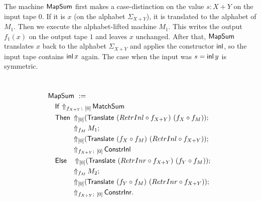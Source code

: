 The machine $\MS{MapSum}$ first makes a case-distinction on the value $s:X+Y$ on the input tape $0$.  If it is $x$ (on the alphabet $\Sigma_{X+Y}$),
it is translated to the alphabet of $M_1$.  Then we execute the alphabet-lifted machine $M_1$.  This writes the output $f_1(x)$ on the output tape $1$
and leaves $x$ unchanged.  After that, $\MS{MapSum}$ translates $x$ back to the alphabet $\Sigma_{X+Y}$ and applies the constructor $\operatorname{\mathsf{inl}}$, so the
input tape contains $\operatorname{\mathsf{inl}} x$ again.  The case when the input was $s=\operatorname{\mathsf{inl}} y$ is symmetric.

\begin{definition}[$\MS{MapSum}$]
  \label{def:MapSum}
  ~
  \begin{align*}
    & \MS{MapSum}~:= \\
    &\quad \MS{If}~{\LiftBoth{\MS{MatchSum}}{f_{X+Y}}{\Vector{0}}} \\
    &\quad \MS{Then}~ \LiftTapes{(\MS{Translate}~(RetrInl \circ f_{X+Y})~(f_X \circ f_M))}{\Vector{0}} \Seq \\
    &\quad \phantom{\MS{Then}}~ \LiftAlphabet{M_1}{f_M} \Seq \\
    &\quad \phantom{\MS{Then}}~ \LiftTapes{(\MS{Translate}~(f_X \circ f_M)~(RetrInl \circ f_{X+Y}))}{\Vector{0}} \Seq \\
    &\quad \phantom{\MS{Then}}~ \LiftBoth{\MS{ConstrInl}}{f_{X+Y}}{\Vector{0}} \\
    &\quad \MS{Else}~~~ \LiftTapes{(\MS{Translate}~(RetrInr \circ f_{X+Y})~(f_Y \circ f_M))}{\Vector{0}} \Seq \\
    &\quad \phantom{\MS{Then}}~ \LiftAlphabet{M_2}{f_M} \Seq \\
    &\quad \phantom{\MS{Then}}~ \LiftTapes{(\MS{Translate}~(f_Y \circ f_M)~(RetrInr \circ f_{X+Y}))}{\Vector{0}} \Seq \\
    &\quad \phantom{\MS{Then}}~ \LiftBoth{\MS{ConstrInr}}{f_{X+Y}}{\Vector{0}}.
  \end{align*}

\end{definition}

